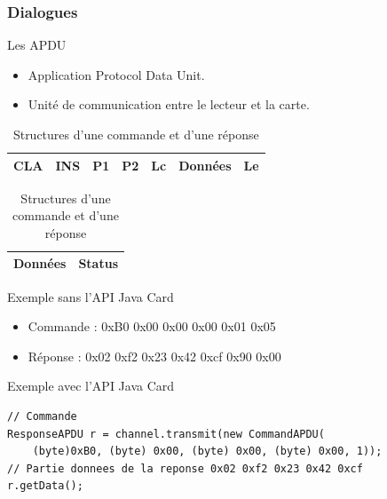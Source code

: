 \documentclass{beamer}
\begin{document}
\begin{frame}
    \frametitle{Dialogues}
    \begin{block}{Les APDU}
        \begin{itemize}
            \item Application Protocol Data Unit.
            \item Unité de communication entre le lecteur et la carte.
        \end{itemize}
    \end{block}
    \begin{table}
        \begin{tabular}{|c|c|c|c|c|c|c|}
            \hline
            CLA & INS & P1 & P2 & Lc & Données & Le\\
            \hline
        \end{tabular}
        \newline
        \begin{tabular}{|c|c|}
            \hline
            Données & Status\\
            \hline
        \end{tabular}
        \caption{Structures d'une commande et d'une réponse}
    \end{table}
\end{frame}

\begin{frame}[fragile]
    \begin{block}{Exemple sans l'API Java Card}
        \begin{itemize}
            \item Commande : 0xB0 0x00 0x00 0x00 0x01 0x05
            \item Réponse : 0x02 0xf2 0x23 0x42 0xcf 0x90 0x00
        \end{itemize}
    \end{block}
    \begin{block}{Exemple avec l'API Java Card}
        \begin{lstlisting}
// Commande
ResponseAPDU r = channel.transmit(new CommandAPDU(
    (byte)0xB0, (byte) 0x00, (byte) 0x00, (byte) 0x00, 1));
// Partie donnees de la reponse 0x02 0xf2 0x23 0x42 0xcf
r.getData(); 
        \end{lstlisting}
    \end{block}
\end{frame}
\end{document}
